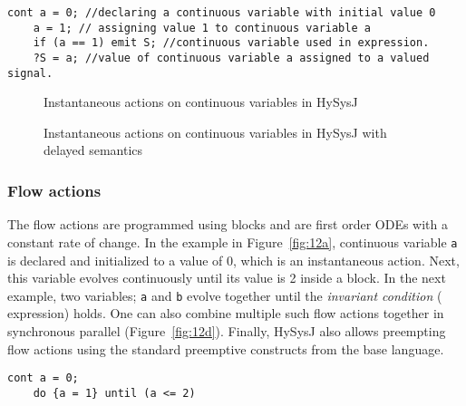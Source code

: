 \documentclass[10pt,journal,cspaper,compsoc]{IEEEtran}
\begin{document}
\newbox{\clfg}
\begin{lrbox}{\clfg}
  \begin{lstlisting}[mathescape,style=sysj,morekeywords={until,cont,signal,loop,abort,await,emit,present,trap,pause,exit,delay,suspend}]
    cont a = 0; //declaring a continuous variable with initial value 0
    a = 1; // assigning value 1 to continuous variable a
    if (a == 1) emit S; //continuous variable used in expression.
    ?S = a; //value of continuous variable a assigned to a valued signal.
  \end{lstlisting}
\end{lrbox}

\begin{figure}[t!]
  \centering
  \usebox\clfg
  \caption{Instantaneous actions on continuous variables in HySysJ}
  \label{fig:15}
\end{figure}

\begin{figure}[t!]
  \centering
  
  \caption{Instantaneous actions on continuous variables in HySysJ with
    delayed semantics}
  \label{fig:16}
\end{figure}

\subsubsection{Flow actions}
\label{sec:flow-actions}

The flow actions are programmed using  
blocks and are first order ODEs with a constant rate of change. In the
example in Figure~\ref{fig:12a}, continuous variable \texttt{a} is
declared and initialized to a value of 0, which is an instantaneous
action. Next, this variable evolves continuously until its value is 2
inside a   block. In the next example, two
variables; \texttt{a} and \texttt{b} evolve together until the
\textit{invariant condition} ( expression) holds. One
can also combine multiple such flow actions together in synchronous
parallel (Figure~\ref{fig:12d}). Finally, HySysJ also allows preempting flow actions using the standard
preemptive constructs from the base language.

\newbox{\clf}
\begin{lrbox}{\clf}
  \begin{lstlisting}[mathescape,style=sysj,morekeywords={until,cont,signal,loop,abort,await,emit,present,trap,pause,exit,delay,suspend}]
    cont a = 0;
    do {a = 1} until (a <= 2) 
  \end{lstlisting}
\end{lrbox}
\end{document}
